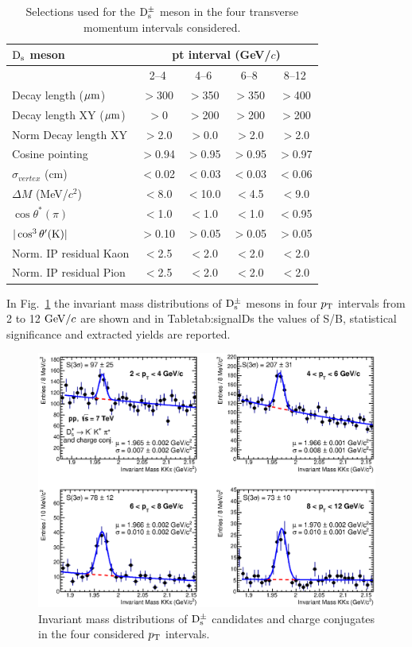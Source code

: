 \begin{table}[tbh!]
\centering
\begin{tabular}{|l|c|c|c|c|} 
\hline 
 ${\rm D_s}$ meson& \multicolumn{4}{c|}{pt interval (GeV/$c$)}\\
\hline
 & 2--4  & 4--6 & 6--8 & 8--12\\
\hline
Decay length ($\mathrm{\mu m}$)        & $>$300 & $>$350 & $>$350 & $>$400\\
Decay length XY ($\mathrm{\mu m}$)     & $>$0 & $>$200 & $>$200 & $>$200\\
Norm Decay length XY          & $>$2.0& $>$0.0 & $>$2.0 & $>$2.0\\
Cosine pointing              & $>$0.94 & $>$0.95 & $>$0.95 & $>$0.97\\
$\sigma_{vertex}$  (cm)          & $<$0.02 & $<$0.03 & $<$0.03 & $<$0.06\\
$\Delta M$ (MeV/$c^{2}$) & $<$8.0 & $<$10.0 & $<$4.5 & $<$9.0\\
$\cos \theta^*(\pi)$    & $<$1.0 & $<$1.0 & $<$1.0 & $<$0.95\\
$|\cos^3 \theta^\prime({\rm K})|$        & $>$0.10 & $>$0.05 & $>$0.05 & $>$0.05\\
Norm. IP residual Kaon  & $<$2.5 & $<$2.0 & $<$2.0 & $<$2.0 \\
Norm. IP residual Pion  & $<$2.5 & $<$2.0 & $<$2.0 & $<$2.0 \\[1ex]
\hline
\end{tabular}
\caption{Selections used for the ${\rm D_s^{\pm}}$ meson in the four transverse momentum intervals considered.} 
\label{tab:cutsDs}
\end{table}
In Fig.~\ref{fig:invmassDs} the invariant mass distributions 
of ${\rm D_s^{\pm}}$ mesons in four $p_{\rm T}$ intervals from 2 to 12 $\mathrm{GeV}/c$ are shown 
and in Tabletab:signalDs the values of S/B, statistical significance and extracted yields are reported.
\begin{figure}[!htb]
\begin{center}
 \includegraphics[width=.99\textwidth]{FigCap4/DsMassHistos_ppPass4.eps}
\caption{Invariant mass distributions of ${\rm D_s^{\pm}}$ candidates and charge
conjugates in the four considered $p_{\rm T}$ intervals.}             
\label{fig:invmassDs}
\end{center}
\end{figure}
